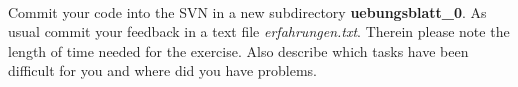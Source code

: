 \\
Commit your code into the SVN in a new subdirectory 
\textbf{uebungsblatt\_0\ExerciseSheetNumber}. As usual commit your feedback in a text file \emph{erfahrungen.txt}. Therein please note the length of time needed for the exercise. Also describe which tasks have been difficult for you and where did you have problems.
